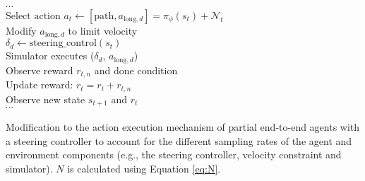 \begin{algorithm}[htb!]
{
        $\cdots$\\
        $\text{Select action } a_t \leftarrow [\text{path}, a_{\text{long},d}] = \pi_{\phi}(s_t) + \mathcal{N}_t$\\
        {
            Modify $a_{\text{long},d}$ to limit velocity \\
            $\delta_d \leftarrow \text{steering_control}(s_t)$ \\
            Simulator executes ($\delta_d$, $a_{\text{long},d}$) \\
            Observe reward $r_{t,n}$ and done condition \\  
            Update reward: $r_t = r_t + r_{t,n}$ \\
        }
        Observe new state $s_{t+1}$ and $r_t$ \\
        $\cdots$\\
}
\caption[Modification to the action execution mechanism for partial end-to-end agents with a steering controller]{Modification to the action execution mechanism of partial end-to-end agents with a steering controller to account for the different sampling rates of the agent and environment components (e.g., the steering controller, velocity constraint and simulator). $N$ is calculated using Equation \ref{eq:N}.}
\label{alg:steer_sample_rate_modification}
\end{algorithm}